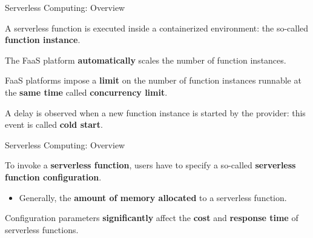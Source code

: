 \documentclass[13.5pt]{beamer}
\newcommand{\B}[1]{\textcolor{TorVergataColor}{\textbf{#1}}}
\begin{document}
\begin{frame}{Serverless Computing: Overview}
	
	\begin{block}{}
		\centering
		A serverless function is executed inside a containerized environment: the so-called \B{function instance}.
	\end{block}

	\vspace{\baselineskip}
	
	\begin{block}{}
		\centering
		The FaaS platform \B{automatically} scales the number of function instances.
	\end{block}

	\vspace{\baselineskip}
	
	\begin{block}{}
		FaaS platforms impose a \B{limit} on the number of function instances runnable at the \B{same time} called \B{concurrency limit}.
	\end{block}

\vspace{\baselineskip}

\begin{block}{}
	A delay is observed when a new function instance is started by the provider: this event is called \B{cold start}.
\end{block}
		
\end{frame} 
\begin{frame}{Serverless Computing: Overview}
	
	\begin{block}{}
		To invoke a \B{serverless function}, users have to specify a so-called \B{serverless function configuration}.
		\begin{itemize}
			\item Generally, the \B{amount of memory allocated} to a serverless function.
		\end{itemize}
	\end{block}
	\vspace{\baselineskip}
	\begin{block}{}
		\centering
		Configuration parameters \B{significantly} affect the \B{cost} and \B{response time} of serverless functions.
	\end{block}
	
	
\end{frame} 
\end{document}
